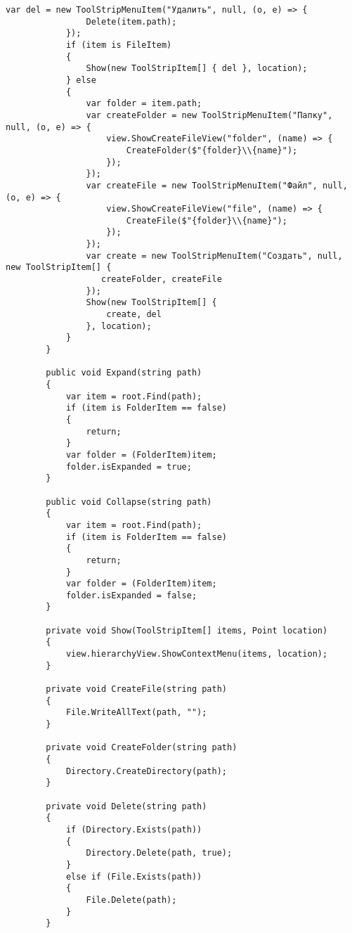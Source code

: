 \documentclass{scrartcl}
\begin{document}
\begin{lstlisting}[language={[Sharp]C}, caption={IDE}, label={experiment}]
            var del = new ToolStripMenuItem("Удалить", null, (o, e) => {
                Delete(item.path);
            });
            if (item is FileItem)
            {
                Show(new ToolStripItem[] { del }, location);
            } else
            {
                var folder = item.path;
                var createFolder = new ToolStripMenuItem("Папку", null, (o, e) => {
                    view.ShowCreateFileView("folder", (name) => {
                        CreateFolder($"{folder}\\{name}");
                    });
                });
                var createFile = new ToolStripMenuItem("Файл", null, (o, e) => {
                    view.ShowCreateFileView("file", (name) => {
                        CreateFile($"{folder}\\{name}");
                    });
                });
                var create = new ToolStripMenuItem("Создать", null, new ToolStripItem[] {
                   createFolder, createFile
                });
                Show(new ToolStripItem[] {
                    create, del
                }, location);
            }
        }

        public void Expand(string path)
        {
            var item = root.Find(path);
            if (item is FolderItem == false)
            {
                return;
            }
            var folder = (FolderItem)item;
            folder.isExpanded = true;
        }

        public void Collapse(string path)
        {
            var item = root.Find(path);
            if (item is FolderItem == false)
            {
                return;
            }
            var folder = (FolderItem)item;
            folder.isExpanded = false;
        }

        private void Show(ToolStripItem[] items, Point location)
        {
            view.hierarchyView.ShowContextMenu(items, location);
        }

        private void CreateFile(string path)
        {
            File.WriteAllText(path, "");
        }

        private void CreateFolder(string path)
        {
            Directory.CreateDirectory(path);
        }

        private void Delete(string path)
        {
            if (Directory.Exists(path))
            {
                Directory.Delete(path, true);
            }
            else if (File.Exists(path))
            {
                File.Delete(path);
            }
        }


\end{lstlisting}
\end{document}
